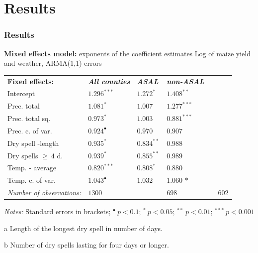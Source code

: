 \documentclass{beamer}              %
\begin{document}
\section{Results}

\begin{frame}

\frametitle{Results}\label{Results} 
{\begin{threeparttable}
\caption{\normalsize{\textbf{ {Mixed  effects model:}} exponents of the coefficient estimates Log of maize yield and weather, ARMA(1,1) errors}}
\label{KenARe11_exponents} 
\begin{tabular}{@{}lllllll} 
 \\
  \textbf{Fixed effects:}&\textit{\textbf{All counties}}&\textit{\textbf{ASAL}}&\textit{\textbf{non-ASAL}}\\
\vspace{-0.2cm}Intercept&$1.296^{***}$&$1.272^{*}$&$1.408^{**}$\\
 \vspace{-0.2cm}Prec. total&$1.081^{*}$&$1.007^{}$&$1.277^{***}$\\
  \vspace{-0.2cm}Prec. total sq.&$0.973^{*}$&$1.003$&$0.881^{***}$\\
 \vspace{-0.2cm}Prec. c. of var.&$0.924^{\bullet}$&$0.970$ &$0.907^{}$\\
 \vspace{-0.2cm}Dry spell -length\tnote{a}&$0.935^{*}$&$0.834^{**}$&$ 0.988^{}$\\
 \vspace{-0.2cm}Dry spells $\geq~4$ d.\tnote{b}&$0.939^{*}$&$0.855^{**}$&$0.989^{}$\\
 \vspace{-0.2cm}Temp. - average&$0.820^{***}$&$0.808^{*}$&$0.880$ $^{}$\\
 \vspace{-0.2cm}Temp. c. of var.&$1.043^{\bullet}$&$1.032$&$1.060$ ${*}$\\
  \hline
\textit{Number of observations:}  &\multicolumn{2}{l}{$1300$}&\multicolumn{2}{l}{$698$}&\multicolumn{2}{l}{$602$}
\\
\end{tabular} 
 \begin{tablenotes}
  \begin{footnotesize}
    \item \textit{Notes:} Standard errors in brackets; \hfill $^{\bullet}~p<0.1$; $^{*}~p<0.05$; $^{**}~p<0.01$; $^{***}~p<0.001$
            \begin{adjustwidth}{1cm}{} 
  \item[a] Length of the longest dry spell in number of days.
    \item[b] Number of dry spells lasting for four days or longer. 
     \end{adjustwidth}
  \end{footnotesize}
\end{tablenotes}
  \end{threeparttable}\par }
\end{frame}
\end{document}
